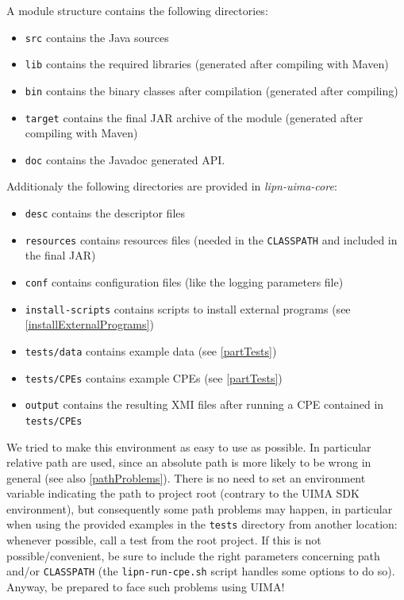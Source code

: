 \documentclass{article}
\newenvironment{xitemize}{
\begin{itemize}
  \setlength{\itemsep}{.3\baselineskip}
  \setlength{\topsep}{0pt}
  \setlength{\parskip}{0pt}
  \setlength{\parsep}{0pt}
}{\end{itemize}}
\newcommand{\uimaModule}{{\em lipn-uima-core}\xspace}
\begin{document}
A module structure contains the following directories:
\begin{xitemize}
\item {\tt src} contains the Java sources
\item {\tt lib} contains the required libraries (generated after compiling with Maven)
\item {\tt bin} contains the binary classes after compilation (generated after compiling)
\item {\tt target} contains the final JAR archive of the module (generated after compiling with Maven)
\item {\tt doc} contains the Javadoc generated API.
\end{xitemize}

Additionaly the following directories are provided in \uimaModule:
\begin{xitemize}
\item {\tt desc} contains the descriptor files
\item {\tt resources} contains resources files (needed in the {\tt CLASSPATH} and included in the final JAR)
\item {\tt conf} contains configuration files (like the logging parameters file)
\item {\tt install-scripts} contains scripts to install external programs (see \ref{installExternalPrograms})
\item {\tt tests/data} contains example data (see \ref{partTests})
\item {\tt tests/CPEs} contains example CPEs (see \ref{partTests})
\item {\tt output} contains the resulting XMI files after running a CPE contained in {\tt tests/CPEs}
\end{xitemize}

We tried to make this environment as easy to use as possible. In particular relative path are used, since an absolute path is more likely to be wrong in general (see also \ref{pathProblems}). There is no need to set an environment variable indicating the path to project root (contrary to the UIMA SDK environment), but consequently some path problems may happen, in particular when using the provided examples in the {\tt tests} directory from another location: whenever possible, call a test from the root project. If this is not possible/convenient, be sure to include the right parameters concerning path and/or {\tt CLASSPATH} (the {\tt lipn-run-cpe.sh} script handles some options to do so). Anyway, be prepared to face such problems using UIMA!
\end{document}
